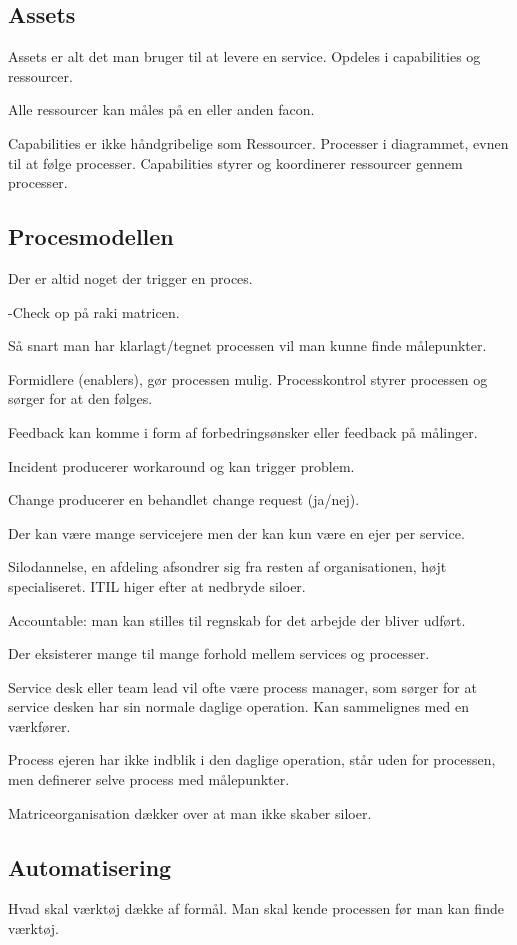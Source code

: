 \subsection{Assets}
Assets er alt det man bruger til at levere en service. Opdeles i capabilities og ressourcer. 

Alle ressourcer kan måles på en eller anden facon.

Capabilities er ikke håndgribelige som Ressourcer. Processer i diagrammet, evnen til at følge processer. Capabilities styrer og koordinerer ressourcer gennem processer.

\subsection{Procesmodellen}
Der er altid noget der trigger en proces.

-Check op på raki matricen.

Så snart man har klarlagt/tegnet processen vil man kunne finde målepunkter.

Formidlere (enablers), gør processen mulig. Processkontrol styrer processen og sørger for at den følges.

Feedback kan komme i form af forbedringsønsker eller feedback på målinger.

Incident producerer workaround og kan trigger problem.

Change producerer en behandlet change request (ja/nej).

Der kan være mange servicejere men der kan kun være en ejer per service.

Silodannelse, en afdeling afsondrer sig fra resten af organisationen, højt specialiseret. ITIL higer efter at nedbryde siloer.

Accountable: man kan stilles til regnskab for det arbejde der bliver udført.

Der eksisterer mange til mange forhold mellem services og processer.

Service desk eller team lead vil ofte være process manager, som sørger for at service desken har sin normale daglige operation. Kan sammelignes med en værkfører.

Process ejeren har ikke indblik i den daglige operation, står uden for processen, men definerer selve process med målepunkter.

Matriceorganisation dækker over at man ikke skaber siloer.

\subsection{Automatisering}
Hvad skal værktøj dække af formål. Man skal kende processen før man kan finde værktøj. 

